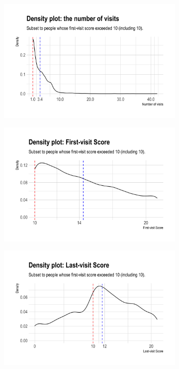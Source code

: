 \documentclass[11pt]{article}
\begin{document}
 \begin{figure}[htb!]
 	\caption{Density plots: subset to patients who has anxiety score equals to or larger than 10}\label{fig:picture2}
 	\begin{subfigure}[h]{0.48\linewidth}
 		\includegraphics[width=\linewidth]{Figures/p7.png}
 		\caption{}\label{fig:p7}
 	\end{subfigure}
 	\hfill
 	\begin{subfigure}[h]{0.48\linewidth}
 		\includegraphics[width=\linewidth]{Figures/p9.png}
 		\caption{}\label{fig:p9}
 	\end{subfigure}
 	\hfill
 	\begin{subfigure}[h]{0.48\linewidth}
 		\includegraphics[width=\linewidth]{Figures/p10.png}

\end{subfigure}
\end{figure}
\end{document}
